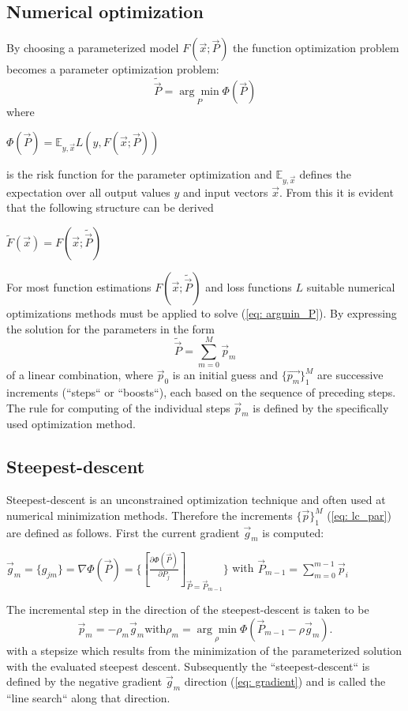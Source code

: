 \documentclass[12pt, a4paper]{article}
\begin{document}
\subsection{Numerical optimization}
By choosing a parameterized model $F(\vec{x};\vec{P})$ the function optimization problem becomes a parameter optimization problem:
\begin{equation}
    \label{eq: argmin_P}
    \tilde{\vec{P}} = \underset{P}{\arg\min} \Phi(\vec{P})
\end{equation}
where
\begin{center}
    $\Phi(\vec{P}) = \mathbb{E}_{y,\vec{x}} L(y,F(\vec{x};\vec{P})) $
\end{center}
is the risk function for the parameter optimization and $\mathbb{E}_{y,\vec{x}}$ defines the expectation over all output values $y$ and input vectors $\vec{x}$. From this it is evident that the following structure can be derived
\begin{center}
    $\tilde{F}(\vec{x}) = F(\vec{x};\tilde{\vec{P}})$
\end{center}
For most function estimations $F(\vec{x};\tilde{\vec{P}})$ and loss functions $L$ suitable numerical optimizations methods must be applied to solve (\ref{eq: argmin_P}). By expressing the solution for the parameters in the form 
\begin{equation}
    \label{eq: lc_par}
    \tilde{\vec{P}} = \sum_{m=0}^{M} \vec{p}_m
\end{equation}
of a linear combination, where $\vec{p}_0$ is an initial guess and $\{\vec{p_m}\}_1^M$ are successive increments (``steps`` or ``boosts``), each based on the sequence of preceding steps. The rule for computing of the individual steps $\vec{p}_m$ is defined by the specifically used optimization method.
\subsection{Steepest-descent}
Steepest-descent is an unconstrained optimization technique and often used at numerical minimization methods. Therefore the increments $\{\vec{p}\}_1^M$ (\ref{eq: lc_par}) are defined as follows. First the current gradient $\vec{g}_m$ is computed:
\begin{center}
    $\vec{g}_m = \{g_{jm}\} = \nabla \Phi(\vec{P}) = \{ [\frac{\partial \Phi(\vec{P})}{\partial P_j}]_{\vec{P}=\vec{P}_{m-1}} \}$ with $\vec{P}_{m-1} = \sum_{m=0}^{m-1} \vec{p}_i$
\end{center}
The incremental step in the direction of the steepest-descent is taken to be
\begin{equation}
    \label{eq: gradient}
    \vec{p}_m = - \rho_m \vec{g}_m \text{with} \rho_m = \underset{\rho}{\arg\min} \Phi(\vec{P}_{m-1} - \rho \vec{g}_m).
\end{equation}
with a stepsize which results from the minimization of the parameterized solution with the evaluated steepest descent. Subsequently the ``steepest-descent`` is defined by the negative gradient \text{-}$\vec{g}_m$ direction (\ref{eq: gradient}) and is called the ``line search`` along that direction.
\end{document}
